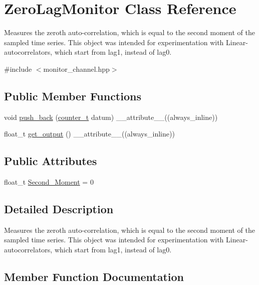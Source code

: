 \hypertarget{classZeroLagMonitor}{}\section{Zero\+Lag\+Monitor Class Reference}
\label{classZeroLagMonitor}


Measures the zeroth auto-\/correlation, which is equal to the second moment of the sampled time series. This object was intended for experimentation with Linear-\/autocorrelators, which start from lag1, instead of lag0.  




{\ttfamily \#include $<$monitor\+\_\+channel.\+hpp$>$}

\subsection*{Public Member Functions}
\begin{DoxyCompactItemize}
\item 
void \hyperlink{classZeroLagMonitor_a22be76548cef864fba0a9c9125a57cce}{push\+\_\+back} (\hyperlink{types_8hpp_a22f279793847eba127de149437848c48}{counter\+\_\+t} datum) \+\_\+\+\_\+attribute\+\_\+\+\_\+((always\+\_\+inline))
\item 
float\+\_\+t \hyperlink{classZeroLagMonitor_ae55b5b21f78fd93d1c8afc95bba69ba4}{get\+\_\+output} () \+\_\+\+\_\+attribute\+\_\+\+\_\+((always\+\_\+inline))
\end{DoxyCompactItemize}
\subsection*{Public Attributes}
\begin{DoxyCompactItemize}
\item 
float\+\_\+t \hyperlink{classZeroLagMonitor_ad155a1aa85eba7a03b65c15649228006}{Second\+\_\+\+Moment} = 0
\end{DoxyCompactItemize}


\subsection{Detailed Description}
Measures the zeroth auto-\/correlation, which is equal to the second moment of the sampled time series. This object was intended for experimentation with Linear-\/autocorrelators, which start from lag1, instead of lag0. 

\subsection{Member Function Documentation}
\mbox{\label{classZeroLagMonitor_ae55b5b21f78fd93d1c8afc95bba69ba4}} 
